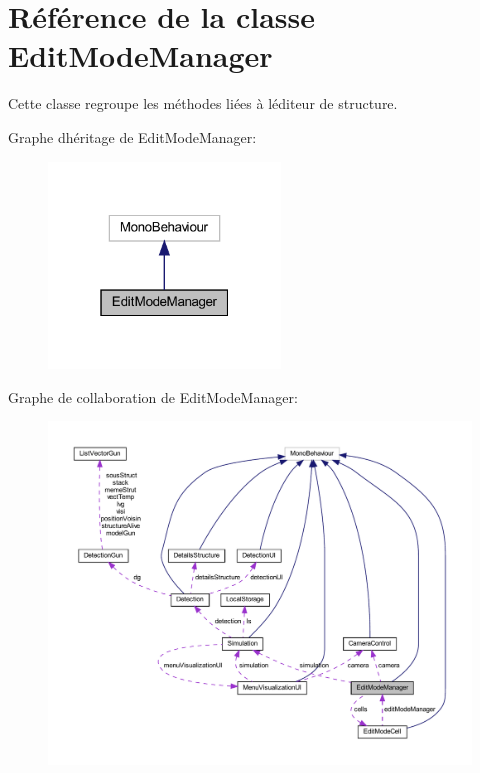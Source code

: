 \hypertarget{class_edit_mode_manager}{}\section{Référence de la classe Edit\+Mode\+Manager}
\label{class_edit_mode_manager}


Cette classe regroupe les méthodes liées à l\textquotesingle{}éditeur de structure.  




Graphe d\textquotesingle{}héritage de Edit\+Mode\+Manager\+:\nopagebreak
\begin{figure}[H]
\begin{center}
\leavevmode
\includegraphics[width=175pt]{class_edit_mode_manager__inherit__graph}
\end{center}
\end{figure}


Graphe de collaboration de Edit\+Mode\+Manager\+:
\nopagebreak
\begin{figure}[H]
\begin{center}
\leavevmode
\includegraphics[width=350pt]{class_edit_mode_manager__coll__graph}
\end{center}
\end{figure}

